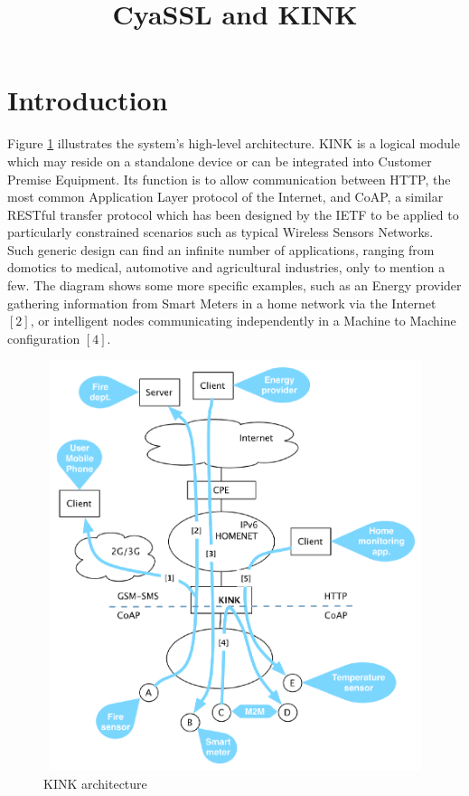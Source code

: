 \documentclass[10pt]{article}
\title{\textbf{CyaSSL and KINK}}
\author{}
\date{}
\begin{document}
\maketitle

\section{Introduction}

Figure \ref{fig:arch} illustrates the system's high-level architecture. KINK is a logical module which may reside on a standalone device or can be integrated into Customer Premise Equipment. Its function is to allow communication between HTTP, the most common Application Layer protocol of the Internet, and CoAP, a similar RESTful transfer protocol which has been designed by the IETF to be applied to particularly constrained scenarios such as typical Wireless Sensors Networks. Such generic design can find an infinite number of applications, ranging from domotics to medical, automotive and agricultural industries, only to mention a few. The diagram shows some more specific examples, such as an Energy provider gathering information from Smart Meters in a home network via the Internet $[2]$, or intelligent nodes communicating independently in a Machine to Machine configuration $[4]$.

\begin{figure}[h]
  \centering
  \includegraphics[width=12cm,height=12cm]{../share/images/kink-homenet}
    \caption{KINK architecture}
    \label{fig:arch}
\end{figure}
\end{document}
